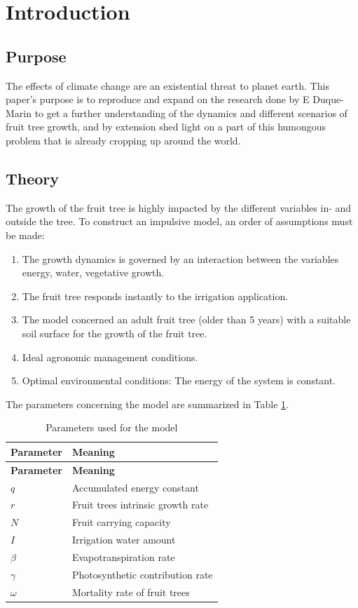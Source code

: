 \documentclass[
]{article}
\providecommand{\tightlist}{%
  \setlength{\itemsep}{0pt}\setlength{\parskip}{0pt}}
\begin{document}
\hypertarget{introduction}{%
\section{Introduction}\label{introduction}}

\hypertarget{purpose}{%
\subsection{Purpose}\label{purpose}}

The effects of climate change are an existential threat to planet earth.
This paper's purpose is to reproduce and expand on the research done by
E Duque-Marin to get a further understanding of the dynamics and
different scenarios of fruit tree growth, and by extension shed light on
a part of this humongous problem that is already cropping up around the
world.

\hypertarget{theory}{%
\subsection{Theory}\label{theory}}

The growth of the fruit tree is highly impacted by the different
variables in- and outside the tree. To construct an impulsive model, an
order of assumptions must be made:

\begin{enumerate}
\def\labelenumi{\arabic{enumi}.}
\tightlist
\item
  The growth dynamics is governed by an interaction between the
  variables energy, water, vegetative growth.
\item
  The fruit tree responds instantly to the irrigation application.
\item
  The model concerned an adult fruit tree (older than 5 years) with a
  suitable soil surface for the growth of the fruit tree.
\item
  Ideal agronomic management conditions.
\item
  Optimal environmental conditions: The energy of the system is
  constant.
\end{enumerate}

The parameters concerning the model are summarized in Table
\ref{tab:tab1}.

\begin{longtable}[]{@{}ll@{}}
\caption{Parameters used for the model \label{tab:tab1}}\tabularnewline
\toprule
\textbf{Parameter} & \textbf{Meaning}\tabularnewline
\midrule
\endfirsthead
\toprule
\textbf{Parameter} & \textbf{Meaning}\tabularnewline
\midrule
\endhead
\(q\) & Accumulated energy constant\tabularnewline
\(r\) & Fruit trees intrinsic growth rate\tabularnewline
\(N\) & Fruit carrying capacity\tabularnewline
\(I\) & Irrigation water amount\tabularnewline
\(\beta\) & Evapotranspiration rate\tabularnewline
\(\gamma\) & Photosynthetic contribution rate\tabularnewline
\(\omega\) & Mortality rate of fruit trees\tabularnewline
\bottomrule
\end{longtable}
\end{document}
